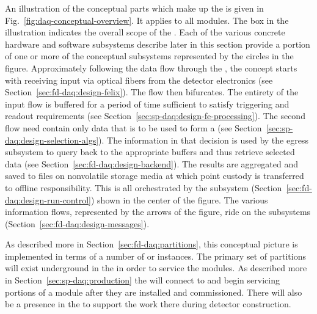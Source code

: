 An illustration of the conceptual parts which make up the    is given in Fig.~\ref{fig:daq-conceptual-overview}. 
It applies to all  modules. 
The box in the illustration indicates the overall scope of the .
Each of the various concrete hardware and software subsystems describe later in this section provide a portion of one or more of the conceptual subsystems represented by the circles in the figure.
Approximately following the data flow through the , the concept starts with receiving input via optical fibers from the detector electronics (see Section~\ref{sec:fd-daq:design-felix}). 
The flow then bifurcates. 
The entirety of the input flow is buffered for a period of time sufficient to satisfy triggering and readout requirements (see Section~\ref{sec:sp-daq:design-fe-processing}). 
The second flow need contain only data that is to be used to form a  (see Section~\ref{sec:sp-daq:design-selection-algs}).
The information in that decision is used by the egress subsystem to query back to the appropriate buffers and thus retrieve selected data (see Section~\ref{sec:fd-daq:design-backend}).
The results are aggregated and saved to files on nonvolatile storage media at which point custody is transferred to offline responsibility.
This is all orchestrated by the  subsystem (Section~\ref{sec:fd-daq:design-run-control}) shown in the center of the figure.   The various information flows, represented by the arrows of the figure, ride on the  subsystems (Section~\ref{sec:fd-daq:design-messages}). 


As described more in Section~\ref{sec:fd-daq:partitions}, this conceptual picture is implemented in terms of a number of  or instances. 
The primary set of partitions will exist underground in the  in order to service the  modules. 
As described more in Section~\ref{sec:sp-daq:production} the  will connect to and begin servicing portions of a  module after they are installed and commissioned. 
There will also be a  presence in the  to support the work there during detector construction.




  



